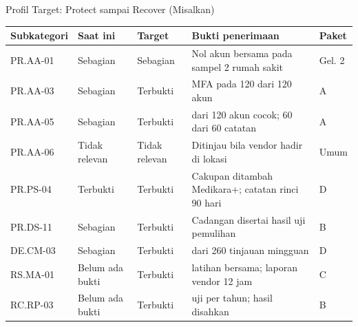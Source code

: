 \documentclass[aspectratio=169, table, 12pt]{beamer}
\begin{document}
\begin{frame}{{\Large Profil Target: Protect sampai Recover (Misalkan)}}
  \vspace{2pt}
  \scriptsize
  \begin{tabularx}{\textwidth}{|>{\raggedright\arraybackslash}p{}|>{\raggedright\arraybackslash}p{}|>{\raggedright\arraybackslash}p{}|>{\raggedright\arraybackslash}X|>{\raggedright\arraybackslash}p{}|}
    \hline
    \textbf{Subkategori} & \textbf{Saat ini} & \textbf{Target} & \textbf{Bukti penerimaan} &
    \textbf{Paket} \\ \hline
    PR.AA-01 & Sebagian & Sebagian & Nol akun bersama pada sampel 2 rumah sakit & Gel. 2 \\ \hline
    PR.AA-03 & Sebagian & Terbukti & MFA pada 120 dari 120 akun & A \\ \hline
    PR.AA-05 & Sebagian & Terbukti & 120 dari 120 akun cocok; 60 dari 60 catatan & A \\ \hline
    PR.AA-06 & Tidak relevan & Tidak relevan & Ditinjau bila vendor hadir di lokasi & Umum \\ \hline
    PR.PS-04 & Terbukti & Terbukti & Cakupan ditambah Medikara+; catatan rinci 90 hari & D \\ \hline
    PR.DS-11 & Sebagian & Terbukti & Cadangan disertai hasil uji pemulihan & B \\ \hline
    DE.CM-03 & Sebagian & Terbukti & 247 dari 260 tinjauan mingguan & D \\ \hline
    RS.MA-01 & Belum ada bukti & Terbukti & 2 latihan bersama; laporan vendor 12 jam & C \\ \hline
    RC.RP-03 & Belum ada bukti & Terbukti & 144 uji per tahun; hasil disahkan & B \\ \hline
  \end{tabularx}
\end{frame}
\end{document}
